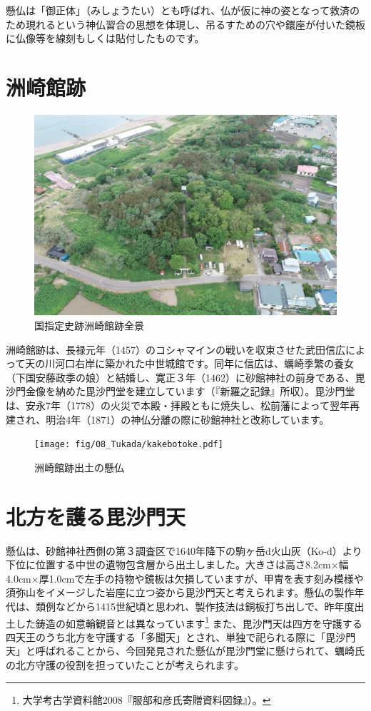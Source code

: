 \documentclass[a4j,11pt,twocolumn,openany]{jsbook}
\begin{document}
懸仏は「御正体」（みしょうたい）とも呼ばれ、仏が仮に神の姿となって救済のため現れるという神仏習合の思想を体現し、吊るすための穴や鐶座が付いた鏡板に仏像等を線刻もしくは貼付したものです。

\section{洲崎館跡}

\begin{figure}[ht]
	\centering
	\includegraphics[width=\linewidth]{fig/08_Tukada/01enkei.JPG}
	\caption{国指定史跡洲崎館跡全景}
	\label{}
	\vspace{-\baselineskip}
\end{figure}

洲崎館跡は、長禄元年（1457）のコシャマインの戦いを収束させた武田信広によって天の川河口右岸に築かれた中世城館です。同年に信広は、蠣崎季繁の養女（下国安藤政季の娘）と結婚し、寛正３年（1462）に砂館神社の前身である、毘沙門金像を納めた毘沙門堂を建立しています（『新羅之記録』所収）。毘沙門堂は、安永7年（1778）の火災で本殿・拝殿ともに焼失し、松前藩によって翌年再建され、明治4年（1871）の神仏分離の際に砂館神社と改称しています。

\begin{figure}[ht]
	\centering
	\texttt{[image: fig/08\_Tukada/kakebotoke.pdf]}
	\caption{洲崎館跡出土の懸仏}
	\label{}
\end{figure}


\section{北方を護る毘沙門天}
懸仏は、砂館神社西側の第３調査区で1640年降下の駒ヶ岳d火山灰（Ko-d）より下位に位置する中世の遺物包含層から出土しました。大きさは高さ8.2cm×幅4.0cm×厚1.0cmで左手の持物や鏡板は欠損していますが、甲冑を表す刻み模様や須弥山をイメージした岩座に立つ姿から毘沙門天と考えられます。懸仏の製作年代は、類例などから1415世紀頃と思われ、製作技法は銅板打ち出しで、昨年度出土した鋳造の如意輪観音とは異なっています\footnote{
	大学考古学資料館2008『服部和彦氏寄贈資料図録』）。
}
また、毘沙門天は四方を守護する四天王のうち北方を守護する「多聞天」とされ、単独で祀られる際に「毘沙門天」と呼ばれることから、今回発見された懸仏が毘沙門堂に懸けられて、蠣崎氏の北方守護の役割を担っていたことが考えられます。
\end{document}
